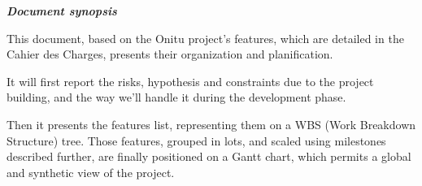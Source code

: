 \thispagestyle{empty}
\vspace*{10mm}

\textbf{\emph{\textcolor{epiBlue}{Document synopsis} } }

This document, based on the Onitu project's features, which are detailed in the Cahier des Charges, presents their organization and planification.

It will first report the risks, hypothesis and constraints due to the project building, and the way we'll handle it during the development phase.

Then it presents the features list, representing them on a WBS (Work Breakdown Structure) tree. Those features, grouped in lots, and scaled using milestones described further, are finally positioned on a Gantt chart, which permits a global and synthetic view of the project.

\newpage
